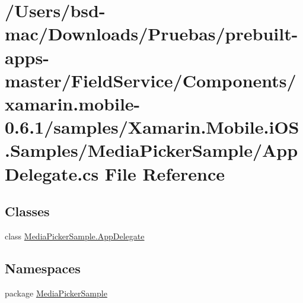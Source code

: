 \hypertarget{_components_2xamarin_8mobile-0_86_81_2samples_2_xamarin_8_mobile_8i_o_s_8_samples_2_media_picker_sample_2_app_delegate_8cs}{\section{/\+Users/bsd-\/mac/\+Downloads/\+Pruebas/prebuilt-\/apps-\/master/\+Field\+Service/\+Components/xamarin.mobile-\/0.6.1/samples/\+Xamarin.Mobile.\+i\+O\+S.\+Samples/\+Media\+Picker\+Sample/\+App\+Delegate.cs File Reference}
\label{_components_2xamarin_8mobile-0_86_81_2samples_2_xamarin_8_mobile_8i_o_s_8_samples_2_media_picker_sample_2_app_delegate_8cs}
}
\subsection*{Classes}
\begin{DoxyCompactItemize}
\item 
class \hyperlink{class_media_picker_sample_1_1_app_delegate}{Media\+Picker\+Sample.\+App\+Delegate}
\end{DoxyCompactItemize}
\subsection*{Namespaces}
\begin{DoxyCompactItemize}
\item 
package \hyperlink{namespace_media_picker_sample}{Media\+Picker\+Sample}
\end{DoxyCompactItemize}
